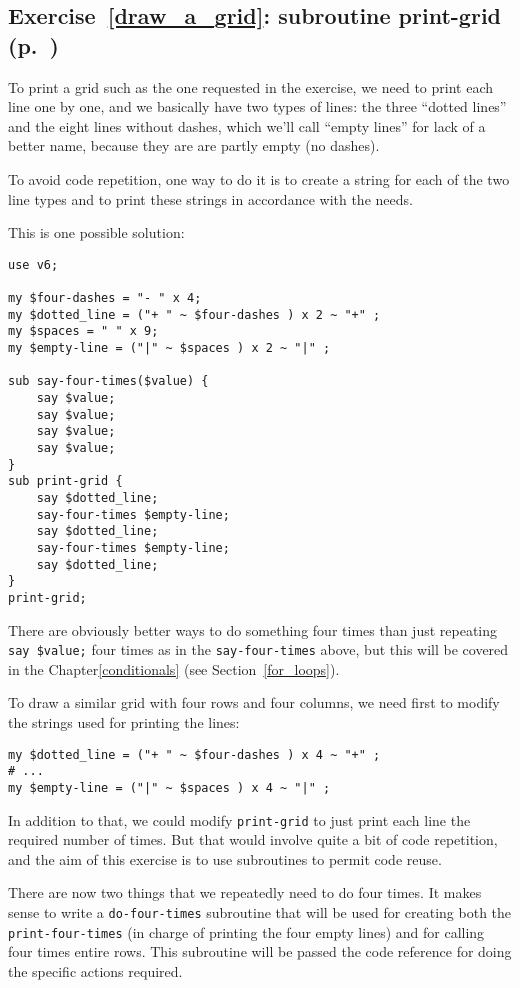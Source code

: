 \subsection{Exercise~\ref{draw_a_grid}: subroutine print-grid 
(p.~\pageref{draw_a_grid})}
\label{sol_draw_a_grid}

To print a grid such as the one requested in the exercise, 
we need to print each line one by one, and we basically 
have two types of lines: the three ``dotted lines'' and 
the eight lines without dashes, which we'll call ``empty 
lines'' for lack of a better name, because they are are 
partly empty (no dashes).

To avoid code repetition, one way to do it is to create 
a string for each of the two line types and to print 
these strings in accordance with the needs.

This is one possible solution:

\begin{verbatim}
use v6;

my $four-dashes = "- " x 4;
my $dotted_line = ("+ " ~ $four-dashes ) x 2 ~ "+" ;
my $spaces = " " x 9;
my $empty-line = ("|" ~ $spaces ) x 2 ~ "|" ;

sub say-four-times($value) {
    say $value;
    say $value;
    say $value;
    say $value;
}
sub print-grid {
    say $dotted_line;
    say-four-times $empty-line;
    say $dotted_line;
    say-four-times $empty-line;
    say $dotted_line;
}
print-grid;
\end{verbatim}

There are obviously better ways to do something four times 
than just repeating \verb'say $value;' four times as in the 
{\tt say-four-times} above, but this will be covered in 
the Chapter\ref{conditionals} (see Section~\ref{for_loops}).

To draw a similar grid with four rows and four columns, we need 
first to modify the strings used for printing the lines:

\begin{verbatim}
my $dotted_line = ("+ " ~ $four-dashes ) x 4 ~ "+" ;
# ...
my $empty-line = ("|" ~ $spaces ) x 4 ~ "|" ;
\end{verbatim}

In addition to that, we could modify {\tt print-grid} to just print 
each line the required number of times. But that would involve 
quite a bit of code repetition, and the aim of this exercise 
is to use subroutines to permit code reuse.

There are now two things that we repeatedly need to do four times. 
It makes sense to write a {\tt do-four-times} subroutine that 
will be used for creating both the {\tt print-four-times} (in 
charge of printing the four empty lines) and for calling 
four times entire rows. This subroutine will be passed the 
code reference for doing the specific actions required.

